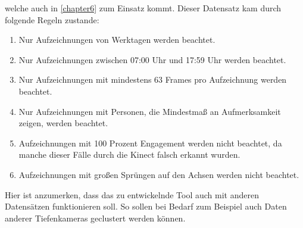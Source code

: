welche auch in \autoref{chapter6} zum Einsatz kommt.
Dieser Datensatz kam durch folgende Regeln zustande:
\begin{enumerate}
  \item Nur Aufzeichnungen von Werktagen werden beachtet.
  \item Nur Aufzeichnungen zwischen 07:00 Uhr und 17:59 Uhr werden beachtet.
  \item Nur Aufzeichnungen mit mindestens 63 Frames pro Aufzeichnung werden beachtet.
  \item Nur Aufzeichnungen mit Personen, die Mindestmaß an Aufmerksamkeit zeigen, werden beachtet.
  \item Aufzeichnungen mit 100 Prozent Engagement werden nicht beachtet, da manche dieser Fälle durch die Kinect falsch erkannt wurden.
  \item Aufzeichnungen mit großen Sprüngen auf den Achsen werden nicht beachtet.
\end{enumerate}
Hier ist anzumerken, dass das zu entwickelnde Tool auch mit anderen Datensätzen funktionieren soll.
So sollen bei Bedarf zum Beispiel auch Daten anderer Tiefenkameras geclustert werden können.
